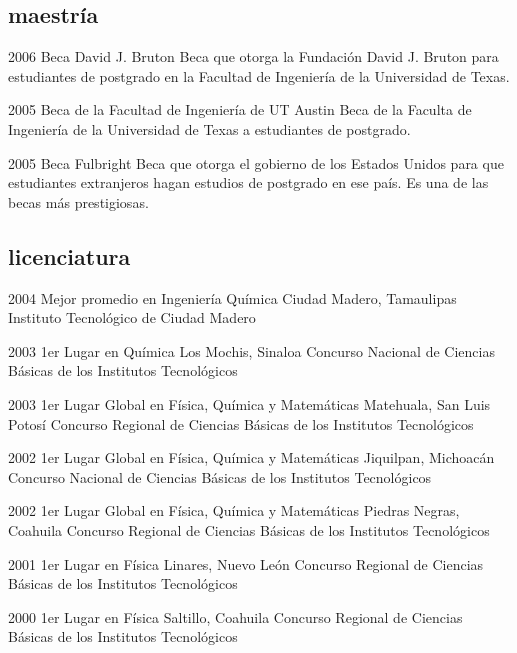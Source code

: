 \documentclass[]{friggeri-cv} %
\begin{document}
\subsection{maestría}

\begin{entrylist}

\entry
{2006}
{Beca David J. Bruton}
{}
{Beca que otorga la Fundación David J. Bruton para estudiantes de postgrado en la Facultad de Ingeniería de la Universidad de Texas.}

\entry
{2005}
{Beca de la Facultad de Ingeniería de UT Austin}
{}
{Beca de la Faculta de Ingeniería de la Universidad de Texas a estudiantes de postgrado.}

\entry
{2005}
{Beca Fulbright}
{}
{Beca que otorga el gobierno de los Estados Unidos para que estudiantes extranjeros hagan estudios de postgrado en ese país. Es una de las becas más prestigiosas.}


\end{entrylist}

\subsection{licenciatura}

\begin{entrylist}

\entry
{2004}
{Mejor promedio en Ingeniería Química}
{Ciudad Madero, Tamaulipas}
{Instituto Tecnológico de Ciudad Madero}

\entry
{2003}
{1er Lugar en Química}
{Los Mochis, Sinaloa}
{Concurso Nacional de Ciencias Básicas de los Institutos Tecnológicos}

\entry
{2003}
{1er Lugar Global en Física, Química y Matemáticas}
{Matehuala, San Luis Potosí}
{Concurso Regional de Ciencias Básicas de los Institutos Tecnológicos}


\entry
{2002}
{1er Lugar Global en Física, Química y Matemáticas}
{Jiquilpan, Michoacán}
{Concurso Nacional de Ciencias Básicas de los Institutos Tecnológicos}

\entry
{2002}
{1er Lugar Global en Física, Química y Matemáticas}
{Piedras Negras, Coahuila}
{Concurso Regional de Ciencias Básicas de los Institutos Tecnológicos}

\entry
{2001}
{1er Lugar en Física}
{Linares, Nuevo León}
{Concurso Regional de Ciencias Básicas de los Institutos Tecnológicos}

\entry
{2000}
{1er Lugar en Física}
{Saltillo, Coahuila}
{Concurso Regional de Ciencias Básicas de los Institutos Tecnológicos}


\end{entrylist}
\end{document}
